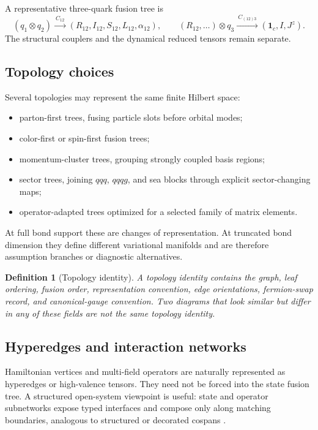 \documentclass[11pt]{article}
\newtheorem{definition}{Definition}[section]
\newcommand{\Jz}{J^z}
\begin{document}
A representative three-quark fusion tree is
\begin{equation}
 \left(q_1\otimes q_2\right)
 \xrightarrow{\ C_{12}\ }
 \left(R_{12},I_{12},S_{12},L_{12},\alpha_{12}\right),
 \qquad
 \left(R_{12},\ldots\right)\otimes q_3
 \xrightarrow{\ C_{(12)3}\ }
 \left(\mathbf 1_c,I,\Jz\right).
\label{eq:qqq-fusion-tree}
\end{equation}
The structural couplers and the dynamical reduced tensors remain separate.

\subsection{Topology choices}

Several topologies may represent the same finite Hilbert space:
\begin{itemize}
 \item parton-first trees, fusing particle slots before orbital modes;
 \item color-first or spin-first fusion trees;
 \item momentum-cluster trees, grouping strongly coupled basis regions;
 \item sector trees, joining \(qqq\), \(qqqg\), and sea blocks through explicit
 sector-changing maps;
 \item operator-adapted trees optimized for a selected family of matrix
 elements.
\end{itemize}
At full bond support these are changes of representation.  At truncated bond
dimension they define different variational manifolds and are therefore
assumption branches or diagnostic alternatives.

\begin{definition}[Topology identity]
A topology identity contains the graph, leaf ordering, fusion order,
representation convention, edge orientations, fermion-swap record, and
canonical-gauge convention.  Two diagrams that look similar but differ in any
of these fields are not the same topology identity.
\end{definition}

\subsection{Hyperedges and interaction networks}

Hamiltonian vertices and multi-field operators are naturally represented as
hyperedges or high-valence tensors.  They need not be forced into the state
fusion tree.  A structured open-system viewpoint is useful: state and operator
subnetworks expose typed interfaces and compose only along matching boundaries,
analogous to structured or decorated cospans
\cite{Fong2015,BaezCourser2020,Courser2020}.
\end{document}
